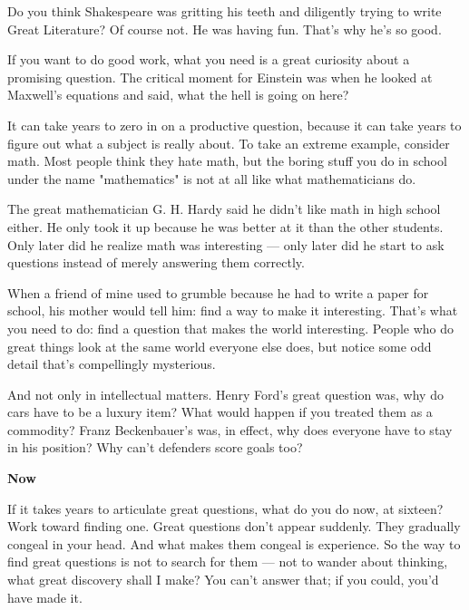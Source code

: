 Do you think Shakespeare
                  was gritting his teeth and diligently trying to write Great
                  Literature? Of course not. He was having fun. That's why he's
                  so good.

If you want to do good work, what you need
                  is a great curiosity about a promising question. The critical
                  moment for Einstein was when he looked at Maxwell's equations
                  and said, what the hell is going on here?

It can
                  take years to zero in on a productive question, because it can
                  take years to figure out what a subject is really about. To
                  take an extreme example, consider math. Most people think they
                  hate math, but the boring stuff you do in school under the
                  name "mathematics" is not at all like what mathematicians
                  do.

The great mathematician G. H. Hardy said he
                  didn't like math in high school either. He only took it up
                  because he was better at it than the other students. Only
                  later did he realize math was interesting --- only later
                  did he start to ask questions instead of merely answering them
                  correctly.

When a friend of mine used to grumble
                  because he had to write a paper for school, his mother would
                  tell him: find a way to make it interesting. That's what you
                  need to do: find a question that makes the world interesting.
                  People who do great things look at the same world everyone
                  else does, but notice some odd detail that's compellingly
                  mysterious.

And not only in intellectual matters.
                  Henry Ford's great question was, why do cars have to be a
                  luxury item? What would happen if you treated them as a
                  commodity? Franz Beckenbauer's was, in effect, why does
                  everyone have to stay in his position? Why can't defenders
                  score goals too?

\textbf{Now}

If it takes
                  years to articulate great questions, what do you do now, at
                  sixteen? Work toward finding one. Great questions don't appear
                  suddenly. They gradually congeal in your head. And what makes
                  them congeal is experience. So the way to find great questions
                  is not to search for them --- not to wander about
                  thinking, what great discovery shall I make? You can't answer
                  that; if you could, you'd have made it.

